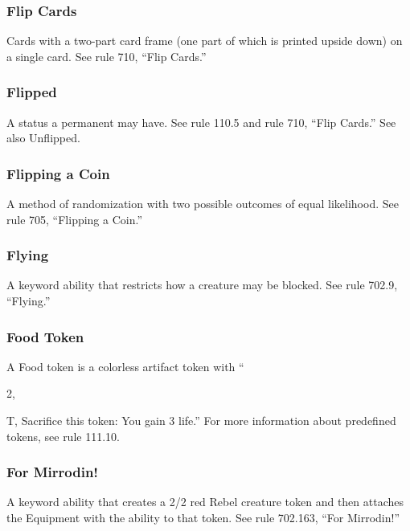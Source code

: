 {{{{{{{{{\subsubsection*{Flip Cards}

Cards with a two-part card frame (one part of which is printed upside down) on a single card. See rule 710, “Flip Cards.”

\subsubsection*{Flipped}

A status a permanent may have. See rule 110.5 and rule 710, “Flip Cards.” See also Unflipped.

\subsubsection*{Flipping a Coin}

A method of randomization with two possible outcomes of equal likelihood. See rule 705, “Flipping a Coin.”

\subsubsection*{Flying}

A keyword ability that restricts how a creature may be blocked. See rule 702.9, “Flying.”

\subsubsection*{Food Token}

A Food token is a colorless artifact token with “{2, {T, Sacrifice this token: You gain 3 life.” For more information about predefined tokens, see rule 111.10.

\subsubsection*{For Mirrodin!}

A keyword ability that creates a 2/2 red Rebel creature token and then attaches the Equipment with the ability to that token. See rule 702.163, “For Mirrodin!”

}}}}}}}}}}}
